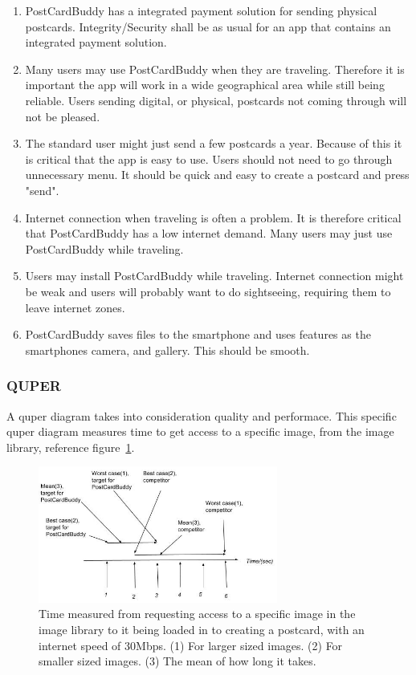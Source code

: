 \documentclass[10pt,a4paper]{article}
\begin{document}
\begin{enumerate}
\item PostCardBuddy has a integrated payment solution for sending physical postcards. Integrity/Security shall be as usual for an app that contains an integrated payment solution.
\item Many users may use PostCardBuddy when they are traveling. Therefore it is important the app will work in a wide geographical area while still being reliable. Users sending digital, or physical, postcards not coming through will not be pleased.
\item The standard user might just send a few postcards a year. Because of this it is critical that the app is easy to use. Users should not need to go through unnecessary menu. It should be quick and easy to create a postcard and press "send".
\item Internet connection when traveling is often a problem. It is therefore critical that PostCardBuddy has a low internet demand. Many users may just use PostCardBuddy while traveling.
\item Users may install PostCardBuddy while traveling. Internet connection might be weak and users will probably want to do sightseeing, requiring them to leave internet zones.
\item PostCardBuddy saves files to the smartphone and uses features as the smartphones camera, and gallery. This should be smooth.
\end{enumerate}

\subsubsection{QUPER}
A quper diagram takes into consideration quality and performace. This specific quper diagram measures time to get access to a specific image, from the image library, reference figure~\ref{fig:quper}.


\begin{figure}[h!]
\centering
\includegraphics[width=0.7\textwidth]{QUPER_v1.jpg}
\caption{Time measured from requesting access to a specific image in the image library to it being loaded in to creating a postcard, with an internet speed of 30Mbps.\newline
(1) For larger sized images. (2) For smaller sized images. (3) The mean of how long it takes. }
\label{fig:quper}
\end{figure}
\end{document}
